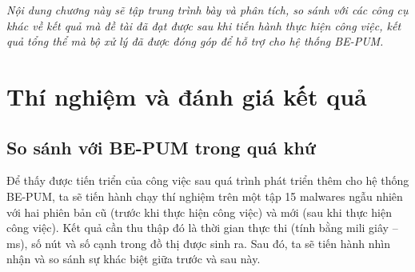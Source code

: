 
\begin{concept}[15cm]
\textit{Nội dung chương này sẽ tập trung trình bày và phân tích, so sánh với các công cụ khác về kết quả mà đề tài đã đạt được sau khi tiến hành thực hiện công việc, kết quả tổng thể mà bộ xử lý đã được đóng góp để hỗ trợ cho hệ thống BE-PUM.}
\end{concept}

\section{Thí nghiệm và đánh giá kết quả}
	\subsection{So sánh với BE-PUM trong quá khứ}
Để thấy được tiến triển của công việc sau quá trình phát triển thêm cho hệ thống BE-PUM, ta sẽ tiến hành chạy thí nghiệm trên một tập 15 malwares ngẫu nhiên với hai phiên bản cũ (trước khi thực hiện công việc) và mới (sau khi thực hiện công việc). Kết quả cần thu thập đó là thời gian thực thi (tính bằng mili giây -- ms), số nút và số cạnh trong đồ thị được sinh ra. Sau đó, ta sẽ tiến hành nhìn nhận và so sánh sự khác biệt giữa trước và sau này.\\

